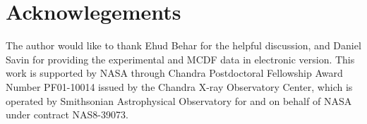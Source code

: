 \documentclass{elsart}
\begin{document}
\section*{Acknowlegements}
The author would like to thank Ehud Behar for the helpful discussion, and
Daniel Savin for providing the experimental and MCDF data in electronic
version. This work is supported by
NASA through Chandra Postdoctoral Fellowship Award Number PF01-10014 issued by
the Chandra X-ray Observatory Center, which is operated by Smithsonian
Astrophysical Observatory for and on behalf of NASA under contract NAS8-39073.



\end{document}
